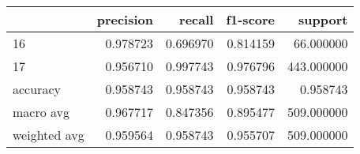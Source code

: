 \begin{tabular}{lrrrr}
\toprule
 & precision & recall & f1-score & support \\
\midrule
16 & 0.978723 & 0.696970 & 0.814159 & 66.000000 \\
17 & 0.956710 & 0.997743 & 0.976796 & 443.000000 \\
accuracy & 0.958743 & 0.958743 & 0.958743 & 0.958743 \\
macro avg & 0.967717 & 0.847356 & 0.895477 & 509.000000 \\
weighted avg & 0.959564 & 0.958743 & 0.955707 & 509.000000 \\
\bottomrule
\end{tabular}
